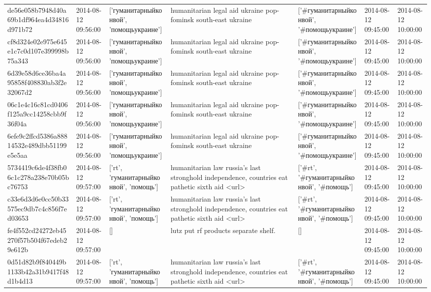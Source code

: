 \begin{tabular}{lllllll}
de56e058b7948d40a69b1df964ea4d34816d971b72 & 2014-08-12 09:56:00 & ['гуманитарныйконвой', 'помощьукраине'] & humanitarian legal aid ukraine pop-fominsk south-east ukraine & ['#гуманитарныйконвой', '#помощьукраине'] & 2014-08-12 09:45:00 & 2014-08-12 10:00:00 \\
cf8d324e02e975e645e1c7c0d107e399998b75a343 & 2014-08-12 09:56:00 & ['гуманитарныйконвой', 'помощьукраине'] & humanitarian legal aid ukraine pop-fominsk south-east ukraine & ['#гуманитарныйконвой', '#помощьукраине'] & 2014-08-12 09:45:00 & 2014-08-12 10:00:00 \\
6d39e58d6ce36ba4a95858f408830ab3f2e32067d2 & 2014-08-12 09:56:00 & ['гуманитарныйконвой', 'помощьукраине'] & humanitarian legal aid ukraine pop-fominsk south-east ukraine & ['#гуманитарныйконвой', '#помощьукраине'] & 2014-08-12 09:45:00 & 2014-08-12 10:00:00 \\
06c1e4c16c81cd0406f125a9cc14258cbb9f36f04a & 2014-08-12 09:56:00 & ['гуманитарныйконвой', 'помощьукраине'] & humanitarian legal aid ukraine pop-fominsk south-east ukraine & ['#гуманитарныйконвой', '#помощьукраине'] & 2014-08-12 09:45:00 & 2014-08-12 10:00:00 \\
6efe9c2ffcd5386a88814532e489dbb51199e5e5aa & 2014-08-12 09:56:00 & ['гуманитарныйконвой', 'помощьукраине'] & humanitarian legal aid ukraine pop-fominsk south-east ukraine & ['#гуманитарныйконвой', '#помощьукраине'] & 2014-08-12 09:45:00 & 2014-08-12 10:00:00 \\
5734419c6de4f38fb06c1c278a238e70b05bc76753 & 2014-08-12 09:57:00 & ['rt', 'гуманитарныйконвой', 'помощь'] & humanitarian law russia's last stronghold independence, countries eat pathetic sixth aid <url> & ['#rt', '#гуманитарныйконвой', '#помощь'] & 2014-08-12 09:45:00 & 2014-08-12 10:00:00 \\
c33e6d3d6e0cc50b33575ec9db7c4c856f7ed03653 & 2014-08-12 09:57:00 & ['rt', 'гуманитарныйконвой', 'помощь'] & humanitarian law russia's last stronghold independence, countries eat pathetic sixth aid <url> & ['#rt', '#гуманитарныйконвой', '#помощь'] & 2014-08-12 09:45:00 & 2014-08-12 10:00:00 \\
fe4f552cd24272eb45270f57b504f67edeb29e612b & 2014-08-12 09:57:00 & [] & lutz put rf products separate shelf. & [] & 2014-08-12 09:45:00 & 2014-08-12 10:00:00 \\
0d51d82b9f840449b1133b42a31b9417f48d1b4d13 & 2014-08-12 09:57:00 & ['rt', 'гуманитарныйконвой', 'помощь'] & humanitarian law russia's last stronghold independence, countries eat pathetic sixth aid <url> & ['#rt', '#гуманитарныйконвой', '#помощь'] & 2014-08-12 09:45:00 & 2014-08-12 10:00:00 \\

\end{tabular}
